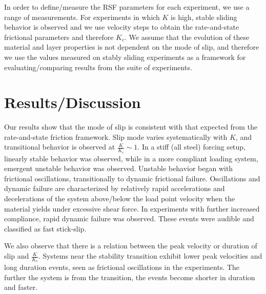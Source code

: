 \documentclass[11pt]{article}
\begin{document}

In order to define/measure the RSF parameters for each experiment, we use a
range of measurements. For experiments in which $K$ is high, stable sliding
behavior is  observed and we use velocity steps to obtain the rate-and-state
frictional parameters and therefore $K_c$.  We assume that the evolution of
these material and layer properties is not dependent on the mode of slip, and
therefore we use the values measured on stably sliding experiments as a
framework for evaluating/comparing results from the suite of experiments.


\section{Results/Discussion}

Our results show that the mode of slip is consistent with that expected from the
rate-and-state friction framework. Slip mode varies systematically with $K$,
and transitional behavior is observed at $\frac{K}{K_c} \sim 1$. In a stiff (all
steel) forcing setup, linearly stable behavior was observed, while in a
more compliant loading system, emergent unstable behavior was observed. Unstable
behavior began with frictional oscillations, transitionally to dynamic frictional
failure. Oscillations and dynamic failure are characterized by relatively rapid
accelerations and decelerations of the system above/below the load point
velocity when the material yields under excessive shear force. In experiments with
further increased compliance, rapid dynamic failure was observed. These events
were audible and classified as fast stick-slip.

We also observe that there is a relation between the peak velocity or duration
of slip and $\frac{K}{K_c}$. Systems near the stability transition exhibit
lower peak velocities and long duration events, seen as frictional oscillations
in the experiments. The further the system is from the transition, the events
become shorter in duration and faster.
\end{document}

